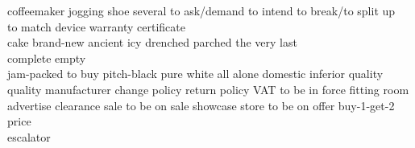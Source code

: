\begin{questions}
\begin{multicols}{3}
  \question coffeemaker \fillin[][0.6in]
  \question jogging shoe \fillin[][0.6in]
  \question several \fillin[][0.6in]
  \question to ask/demand \fillin[][0.6in]
  \question to intend \fillin[][0.5in]
  \question to break/to split up \\
  \fillin[hajota]
  \question to match \fillin[sovittaa][0.6in]
  \question device  \fillin[laite][0.5in]
  \question warranty certificate \\ \fillin[takuutodistus]
  \question cake \fillin[leivos][0.5in]
  \question brand-new \fillin[upouusi][0.5in]
  \question ancient \fillin[ikivanha][0.5in]
  \question icy \fillin[jääkylmä]
  \question drenched \fillin[likomärkä]
  \question parched \fillin[rutikuiva]
  \question the very last \\\fillin[vihoviimeinen]
  \question complete empty \\\fillin[typötyhjä]
  \question jam-packed \fillin[täpötäysi][0.6in]
  \question to buy \fillin[hankkia][0.5in]
  \question pitch-black \fillin[pilkkopimeä][0.8in]
  \question pure white \fillin[vitivalkoinen][0.7in]
  \question all alone \fillin[ypöyksin][0.5in]
  \question domestic \fillin[kotimainen][0.5in]
  \question inferior quality \fillin[huonolaatuinen]
  \question quality \fillin[laatu][0.5in]
  \question manufacturer \fillin[valmistaja][0.7in]
  \question change policy 
  \question return policy \fillin[palautusoikeus]
  \question VAT \fillin[arvonlisävero]
  \question to be in force 
  \question fitting room \fillin[sovituskoppi]
  \question advertise \fillin[mainostaa]
  \question clearance sale \fillin[alennusmyynti]
  \question to be on sale 
  \question showcase \fillin[näyteikkuna]
  \question store \fillin[myymälä]
  \question to be on offer 
  \question buy-1-get-2 price \\
  \question escalator \fillin[liukuportaat]
\end{multicols}
\end{questions}
